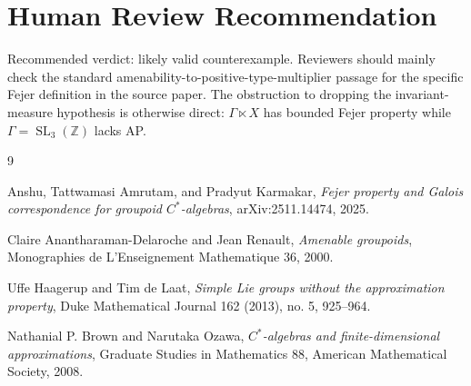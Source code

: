 \documentclass[11pt]{article}
\newcommand{\Z}{\mathbb Z}
\begin{document}
\section*{Human Review Recommendation}

Recommended verdict: likely valid counterexample.  Reviewers should mainly
check the standard amenability-to-positive-type-multiplier passage for the
specific Fejer definition in the source paper.  The obstruction to dropping
the invariant-measure hypothesis is otherwise direct: \(\Gamma\ltimes X\) has
bounded Fejer property while \(\Gamma=\operatorname{SL}_3(\Z)\) lacks AP.

\begin{thebibliography}{9}

Anshu, Tattwamasi Amrutam, and Pradyut Karmakar,
\emph{Fejer property and Galois correspondence for groupoid \(C^*\)-algebras},
arXiv:2511.14474, 2025.

Claire Anantharaman-Delaroche and Jean Renault,
\emph{Amenable groupoids},
Monographies de L'Enseignement Mathematique 36, 2000.

Uffe Haagerup and Tim de Laat,
\emph{Simple Lie groups without the approximation property},
Duke Mathematical Journal 162 (2013), no. 5, 925--964.

Nathanial P. Brown and Narutaka Ozawa,
\emph{\(C^*\)-algebras and finite-dimensional approximations},
Graduate Studies in Mathematics 88, American Mathematical Society, 2008.

\end{thebibliography}
\end{document}
